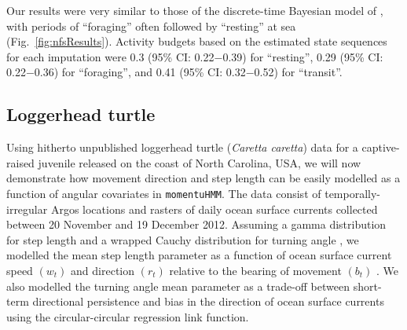 \documentclass[12pt]{article}\usepackage[]{graphicx}\usepackage[]{color}
\begin{document}
Our results were very similar to those of the discrete-time Bayesian model of \cite{McClintockEtAl2014b}, with periods of ``foraging'' often followed by ``resting'' at sea (Fig.\ \ref{fig:nfsResults}).  Activity budgets based on the estimated state sequences for each imputation were 0.3 (95\% CI: 0.22$-$0.39) for ``resting'', 0.29 (95\% CI: 0.22$-$0.36) for ``foraging'', and 0.41 (95\% CI: 0.32$-$0.52) for ``transit''.

\subsection{Loggerhead turtle}
\label{sec:turtle}
Using hitherto unpublished loggerhead turtle ({\it Caretta caretta}) data for a captive-raised juvenile released on the coast of North Carolina, USA, we will now demonstrate how movement direction and step length can be easily modelled as a function of angular covariates in \verb|momentuHMM|. The data consist of %
temporally-irregular Argos locations and rasters of daily ocean surface currents collected between 20 November and 19 December 2012. Assuming a gamma distribution for step length %
and a wrapped Cauchy distribution for turning angle%
, we modelled the mean step length parameter %
as a function of ocean surface current speed $(w_t)$ and direction $(r_t)$ relative to the bearing of movement $(b_t)$%
. We also modelled the turning angle mean parameter %
as a trade-off between short-term directional persistence and bias in the direction of ocean surface currents using the circular-circular regression link function.
\end{document}

